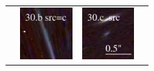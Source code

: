 \documentclass[useAMS,usenatbib]{mn2e}
\begin{document}
\begin{table}
\begin{tabular}{cccc}
    & \multicolumn{1}{m{1.7cm}}{\includegraphics[height=2.00cm,clip]{figs/enfw_img/rgb.pre_30_b_c_tri.ps}}
    & \multicolumn{1}{m{1.7cm}}{\includegraphics[height=2.00cm,clip]{figs/enfw_img/rgb.src_30_c.ps}} \\
  \end{tabular}

\end{table}

\clearpage
\end{document}
